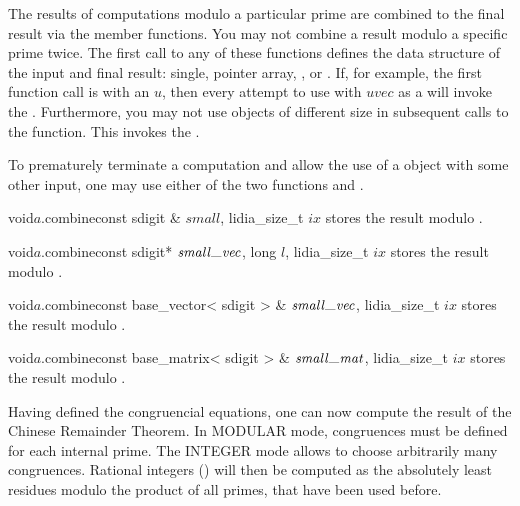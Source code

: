 The results of computations modulo a particular prime are combined to the final result via the
 member functions.  You may not combine a result modulo a specific prime twice.
The first call to any of these functions defines the data structure of the input and final
result: single, pointer array, , or .  If, for example, the
first function call is  with an  $u$, then every
attempt to use  with $\mathit{uvec}$ as a
 will invoke the \LEH.  Furthermore, you may not use objects of
different size in subsequent calls to the function.  This invokes the \LEH.

To prematurely terminate a computation and allow the use of a  object
with some other input, one may use either of the two functions 
and .

\begin{fcode}{void}{$a$.combine}{const sdigit & $\mathit{small}$, lidia_size_t $ix$}
  stores the result modulo .
\end{fcode}

\begin{fcode}{void}{$a$.combine}{const sdigit* $\smallvec$, long $l$, lidia_size_t $ix$}
  stores the result modulo .
\end{fcode}

\begin{fcode}{void}{$a$.combine}{const base_vector< sdigit > & $\smallvec$, lidia_size_t $ix$}
  stores the result modulo .
\end{fcode}

\begin{fcode}{void}{$a$.combine}{const base_matrix< sdigit > & $\smallmat$, lidia_size_t $ix$}
  stores the result modulo .
\end{fcode}




Having defined the congruencial equations, one can now compute the result of the Chinese
Remainder Theorem.  In MODULAR mode, congruences must be defined for each internal prime.  The
INTEGER mode allows to choose arbitrarily many congruences.  Rational integers ()
will then be computed as the absolutely least residues modulo the product of all primes, that
have been used before.

